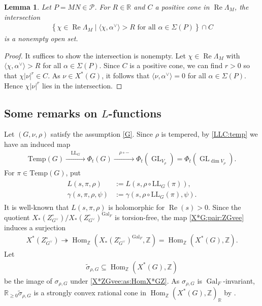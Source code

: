 \documentclass[10pt]{amsart}
\newtheorem{lemma}[theorem]{Lemma}
\theoremstyle{definition}
\numberwithin{equation}{section}
\DeclareMathOperator{\Hom}{\mathrm{Hom}}
\DeclareMathOperator{\GL}{\mathrm{GL}}
\DeclareMathOperator{\Gal}{\mathrm{Gal}}
\numberwithin{equation}{subsection}
\newcommand{\RR}{\mathbb{R}}
\newcommand{\Temp}{\mathrm{Temp}}
\renewcommand{\Re}{\mathop{\mathrm{Re}}}
\begin{document}
\begin{lemma}\label{intertwining:posCone}
   Let $P=MN\in \mathcal{P}$. For $R\in\mathbb{R}$ and $C$ a positive cone in $\Re\Lambda_M$, the intersection
   \begin{align*}
       \left\{\chi\in\Re\Lambda_M\mid \langle\chi,\alpha^\vee\rangle > R\text{ for all }\alpha\in \Sigma(P)\right\} \cap C
   \end{align*}
   is a nonempty open set.
\end{lemma}
\begin{proof} It suffices to show the intersection is nonempty. Let $\chi\in\Re\Lambda_M$ with $\langle\chi,\alpha^\vee\rangle>R$ for all $\alpha\in \Sigma(P)$. Since $C$ is a positive cone, we can find $r>0$ so that $\chi|\nu|^r\in C$. As $\nu\in X^*(G)$, it follows that $\langle \nu,\alpha^\vee\rangle = 0$ for all $\alpha\in \Sigma(P)$. Hence $\chi|\nu|^r$ lies in the intersection.
\end{proof}


\subsection{Some remarks on $L$-functions}\label{ssec:LLC}
Let $(G,\nu,\rho)$ satisfy the assumption \eqref{G}. Since $\rho$ is tempered, by \eqref{LLC:temp} we have an induced map
\begin{align*}
    \mathrm{Temp}(G)\xrightarrow{\quad\mathrm{LL}_G\quad}\Phi_t(G)\xrightarrow{\quad\rho\circ-\quad} \Phi_t(\GL_{V_\rho}) = \Phi_t(\GL_{\dim V_\rho}).
\end{align*}
For $\pi\in \Temp(G)$, put
\begin{align}\label{eq:Lgamma:LL}
\begin{split}
    L(s,\pi,\rho)&:=L(s,\rho\circ \mathrm{LL}_G(\pi)),\\
    \gamma(s,\pi,\rho,\psi)&:=\gamma(s,\rho\circ \mathrm{LL}_G(\pi),\psi).
\end{split}
\end{align}
It is well-known that $L(s,\pi,\rho)$ is holomorphic for $\Re(s)>0.$ Since the quotient $X_*(Z_{G^\vee}^\circ)/X_*(Z_{G^\vee}^\circ)^{\Gal_F}$ is torsion-free, the map \eqref{X*G:pair:ZGvee} induces a surjection
\begin{align}\label{X*ZGvee:as:HomX*GZ}
    X^*(Z^\circ_{G^\vee})\twoheadrightarrow \Hom_{\mathbb{Z}}(X_*(Z_{G^\vee}^\circ)^{\Gal_F},\mathbb{Z})=\Hom_{\mathbb{Z}}(X^*(G),\mathbb{Z}).
\end{align}
 Let
\begin{align*}
    \widetilde{\sigma}_{\rho,G} \subseteq \Hom_{\mathbb{Z}}(X^*(G),\mathbb{Z})
\end{align*}
be the image of $\sigma_{\rho,G}$ under \eqref{X*ZGvee:as:HomX*GZ}. As $\sigma_{\rho,G}$ is $\Gal_F$-invariant,  $\mathbb{R}_{\geq 0}\widetilde{\sigma}_{\rho,G}$ is a strongly convex rational cone in $\Hom_{\mathbb{Z}}(X^*(G),\mathbb{Z})_\RR$ by \cite[Lemma 6.11]{DRS}.
\end{document}
